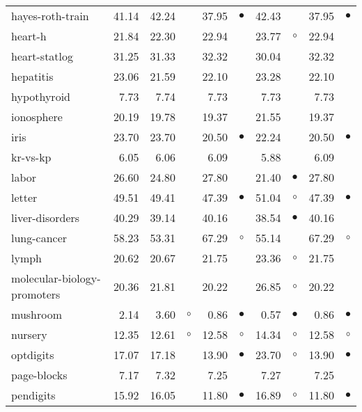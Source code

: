 {\begin{longtable}{lrr@{\hspace{0.1cm}}cr@{\hspace{0.1cm}}cr@{\hspace{0.1cm}}cr@{\hspace{0.1cm}}c}
hayes-roth-train & 41.14 & 42.24 &          & 37.95 & $\bullet$ & 42.43 &           & 37.95 & $\bullet$\\
heart-h & 21.84 & 22.30 &          & 22.94 &           & 23.77 &   $\circ$ & 22.94 &          \\
heart-statlog & 31.25 & 31.33 &          & 32.32 &           & 30.04 &           & 32.32 &          \\
hepatitis & 23.06 & 21.59 &          & 22.10 &           & 23.28 &           & 22.10 &          \\
hypothyroid &  7.73 &  7.74 &          &  7.73 &           &  7.73 &           &  7.73 &          \\
ionosphere & 20.19 & 19.78 &          & 19.37 &           & 21.55 &           & 19.37 &          \\
iris & 23.70 & 23.70 &          & 20.50 & $\bullet$ & 22.24 &           & 20.50 & $\bullet$\\
kr-vs-kp &  6.05 &  6.06 &          &  6.09 &           &  5.88 &           &  6.09 &          \\
labor & 26.60 & 24.80 &          & 27.80 &           & 21.40 & $\bullet$ & 27.80 &          \\
letter & 49.51 & 49.41 &          & 47.39 & $\bullet$ & 51.04 &   $\circ$ & 47.39 & $\bullet$\\
liver-disorders & 40.29 & 39.14 &          & 40.16 &           & 38.54 & $\bullet$ & 40.16 &          \\
lung-cancer & 58.23 & 53.31 &          & 67.29 &   $\circ$ & 55.14 &           & 67.29 &   $\circ$\\
lymph & 20.62 & 20.67 &          & 21.75 &           & 23.36 &   $\circ$ & 21.75 &          \\
molecular-biology-promoters & 20.36 & 21.81 &          & 20.22 &           & 26.85 &   $\circ$ & 20.22 &          \\
mushroom &  2.14 &  3.60 &  $\circ$ &  0.86 & $\bullet$ &  0.57 & $\bullet$ &  0.86 & $\bullet$\\
nursery & 12.35 & 12.61 &  $\circ$ & 12.58 &   $\circ$ & 14.34 &   $\circ$ & 12.58 &   $\circ$\\
optdigits & 17.07 & 17.18 &          & 13.90 & $\bullet$ & 23.70 &   $\circ$ & 13.90 & $\bullet$\\
page-blocks &  7.17 &  7.32 &          &  7.25 &           &  7.27 &           &  7.25 &          \\
pendigits & 15.92 & 16.05 &          & 11.80 & $\bullet$ & 16.89 &   $\circ$ & 11.80 & $\bullet$\\

\end{longtable}}
